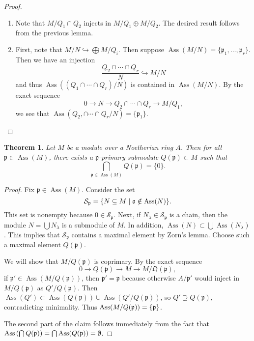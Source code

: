 \documentclass[leqno, openany]{memoir}
\newtheorem{thm}{Theorem}[section]
\theoremstyle{definition}
\theoremstyle{remark}
\theoremstyle{plain}
\theoremstyle{definition}
\theoremstyle{remark}
\newcommand{\mc}[1]{\mathcal{#1}}
\newcommand{\mf}[1]{\mathfrak{#1}}
\DeclareMathOperator{\Ass}{Ass}
\begin{document}
\begin{proof}
    \begin{enumerate}
        \item Note that $M / Q_1 \cap Q_2$ injects in $M / Q_1 \oplus M / Q_2$. The desired result follows from the previous lemma.
        \item First, note that $M/N \hookrightarrow \bigoplus M / Q_i$. Then suppose $\Ass(M/N) = \{ \mf{p}_1, \ldots, \mf{p}_r \}$. Then we have an injection
            \[ \frac{Q_2 \cap \cdots \cap Q_r}{N} \hookrightarrow M/N \]
            and thus $\Ass((Q_1 \cap  \cdots \cap Q_r)/N)$ is contained in $\Ass(M/N)$. By the exact sequence
            \[ 0 \to N \to Q_2 \cap \cdots \cap Q_r \to M/Q_1, \]
            we see that $\Ass(Q_2, \cap \cdots \cap Q_r / N) = \{ \mf{p}_1 \}$. \qedhere
    \end{enumerate}
\end{proof}

\begin{thm}
    Let $M$ be a module over a Noetherian ring $A$. Then for all $\mf{p} \in \Ass(M)$, there exists a $\mf{p}$-primary submodule $Q(\mf{p}) \subset M$ such that
    \[ \bigcap_{\mf{p} \in \Ass(M)} Q(\mf{p}) = \{0 \}. \]
\end{thm}

\begin{proof}
    Fix $\mf{p} \in \Ass(M)$. Consider the set 
    \[ \mc{S}_{\mf{p}} = \qty{ N \subseteq M \mid \mf{o} \notin \Ass(N) }. \]
    This set is nonempty because $0 \in \mc{S}_{\mf{p}}$. Next, if $N_{\lambda} \in \mc{S}_{\mf{p}}$ is a chain, then the module $N = \bigcup N_{\lambda}$ is a submodule of $M$. In addition, $\Ass(N) \subset \bigcup \Ass(N_{\lambda})$. This implies that $\mc{S}_{\mf{p}}$ contains a maximal element by Zorn's lemma. Choose such a maximal element $Q(\mf{p})$.

    We will show that $M/Q(\mf{p})$ is coprimary. By the exact sequence 
    \[ 0 \to Q(\mf{p}) \to M \to M/\mf{Q}(\mf{p}), \]
    if $\mf{p}' \in \Ass(M/Q(\mf{p}))$, then $\mf{p}' = \mf{p}$ because otherwise $A/ \mf{p}'$ would inject in $M / Q(\mf{p})$ as $Q'/Q(\mf{p})$. Then $\Ass(Q') \subset \Ass(Q(\mf{p})) \cup \Ass(Q' / Q(\mf{p}))$, so $Q' \supsetneq Q(\mf{p})$, contradicting minimality. Thus $\Ass(M / Q(\mf{p})) = \qty{\mf{p}}$. 

    The second part of the claim follows immediately from the fact that $\Ass\qty(\bigcap Q(\mf{p})) = \bigcap \Ass(Q(\mf{p})) = \emptyset$.
\end{proof}
\end{document}
